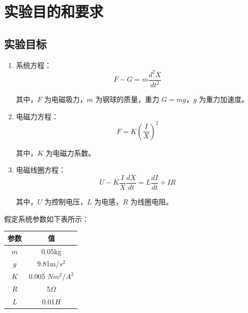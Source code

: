 \documentclass[12pt,a4paper,UTF8]{article}
\begin{document}

\maketoc    %
\section{实验目的和要求}
\subsection{实验目标}
\begin{enumerate}
\item 系统方程：
\begin{equation}
F - G = m \frac{d^2 X}{dt^2}
\end{equation}

其中，$F$ 为电磁吸力，$m$ 为钢球的质量，重力 $G = mg$，$g$ 为重力加速度。

\item 电磁力方程：
\begin{equation}
F = K \left( \frac{I}{X} \right)^2
\end{equation}

其中，$K$ 为电磁力系数。

\item 电磁线圈方程：
\begin{equation}
U - K \frac{I}{X} \frac{dX}{dt} = L \frac{dI}{dt} + IR
\end{equation}

其中，$U$ 为控制电压，$L$ 为电感，$R$ 为线圈电阻。
\end{enumerate}

假定系统参数如下表所示：

\begin{table}[htbp]
\centering
\begin{tabular}{|c|c|}
\hline
参数 & 值 \\
\hline
$m$ & 0.05kg \\
$g$ & 9.81m/$s^2$ \\
$K$ & 0.005 $N m^2/A^2$ \\
$R$ & 5$\Omega$ \\
$L$ & 0.01$H$ \\
\hline
\end{tabular}
\end{table}
\end{document}
